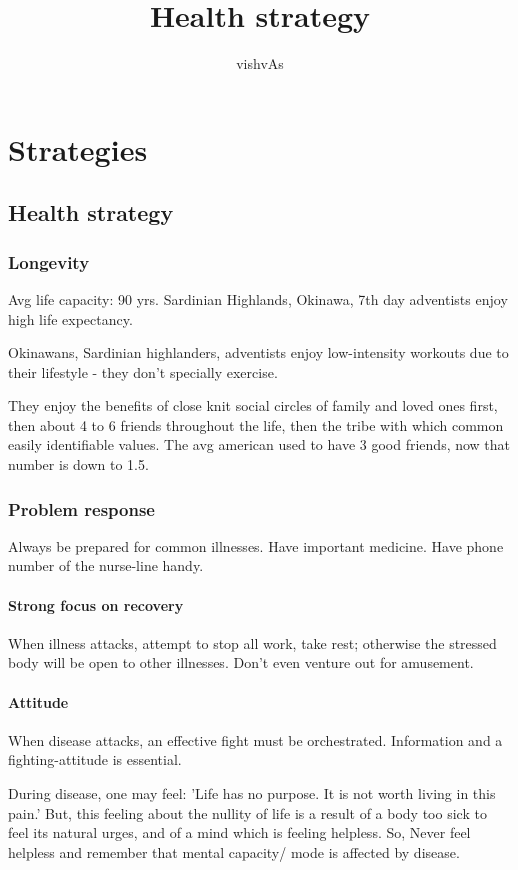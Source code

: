\documentclass[oneside, article]{memoir}
\title{Health strategy}
\author{vishvAs}
\begin{document}
\maketitle

\part{Strategies}
\chapter{Health strategy}
\section{Longevity}
Avg life capacity: 90 yrs.  Sardinian Highlands, Okinawa, 7th day adventists enjoy high life expectancy.
 
 Okinawans, Sardinian highlanders, adventists enjoy low-intensity workouts due to their lifestyle - they don't specially exercise.
 
 They enjoy the benefits of close knit social circles of family and loved ones first, then about 4 to 6 friends throughout the life, then the tribe with which common easily identifiable values. The avg american used to have 3 good friends, now that number is down to 1.5.

\section{Problem response}
Always be prepared for common illnesses. Have important medicine. Have phone number of the nurse-line handy.

\subsection{Strong focus on recovery}
When illness attacks, attempt to stop all work, take rest; otherwise the stressed body will be open to other illnesses. Don't even venture out for amusement.

\subsection{Attitude}
When disease attacks, an effective fight must be orchestrated. Information and a fighting-attitude is essential.

During disease, one may feel: 'Life has no purpose. It is not worth living in this pain.' But, this feeling about the nullity of life is a result of a body too sick to feel its natural urges, and of a mind which is feeling helpless. So, Never feel helpless and remember that mental capacity/ mode is affected by disease.
\end{document}
